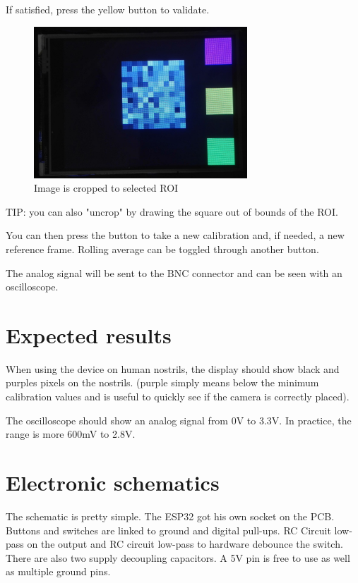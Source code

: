 \documentclass[a4paper]{article}
\begin{document}
If satisfied, press the yellow button to validate.

\begin{figure}[h!]
    \centering
    \includegraphics[width = 8cm]{images/screenCropped.jpg}
    \caption{Image is cropped to selected ROI}
    \label{fig:screenCropped}
\end{figure}


TIP: you can also "uncrop" by drawing the square out of bounds of the ROI.

You can then press the button to take a new calibration and, if needed, a new reference frame. Rolling average can be toggled through another button.

The analog signal will be sent to the BNC connector and can be seen with an oscilloscope.

\newpage

\section{Expected results}
When using the device on human nostrils, the display should show black and purples pixels on the nostrils. (purple simply means below the minimum calibration values and is useful to quickly see if the camera is correctly placed).

The oscilloscope should show an analog signal from 0V to 3.3V. In practice, the range is more 600mV to 2.8V.

\section{Electronic schematics}
The schematic is pretty simple.
The ESP32 got his own socket on the PCB.
Buttons and switches are linked to ground and digital pull-ups.
RC Circuit low-pass on the output and RC circuit low-pass to hardware debounce the switch.
There are also two supply decoupling capacitors.
A 5V pin is free to use as well as multiple ground pins.
\end{document}
